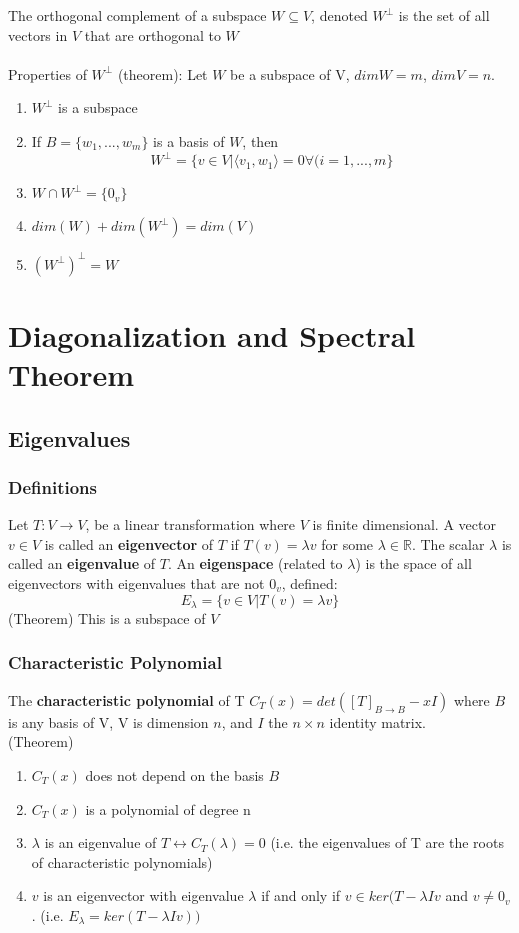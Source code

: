 \documentclass{article}
\begin{document}
The orthogonal complement of a subspace $W\subseteq V$, denoted $W^\bot$ is the set of all vectors in $V$ that are orthogonal to $W$
\\\\
Properties of $W^\bot$ (theorem): Let $W$ be a subspace of V, $dimW=m$, $dimV=n$.
\begin{enumerate}
    \item $W^\bot$ is a subspace
    \item If $B=\{w_1,...,w_m\}$ is a basis of $W$, then \[W^\bot=\{v\in V|\langle v_1,w_1\rangle=0 \forall(i=1,...,m\}\]
    \item $W\cap W^\bot = \{0_v\}$
    \item $dim(W)+dim(W^\bot) = dim(V)$
    \item $(W^\bot)^\bot=W$
\end{enumerate}
\section{Diagonalization and Spectral Theorem} %
\subsection{Eigenvalues}
\subsubsection{Definitions}
Let $T:V\rightarrow V$, be a linear transformation where $V$ is finite dimensional. A vector $v\in V$ is called an \textbf{eigenvector} of $T$ if $T(v)=\lambda v$ for some $\lambda\in\mathds{R}$. The scalar $\lambda$ is called an \textbf{eigenvalue }of $T$. An \textbf{eigenspace} (related to $\lambda$) is the space of all eigenvectors with eigenvalues that are not $0_v$, defined:
\[E_\lambda=\{v\in V|T(v)=\lambda v\}\]
(Theorem) This is a subspace of $V$
\subsubsection{Characteristic Polynomial}
The \textbf{characteristic polynomial} of T $C_T(x)=det([T]_{B\rightarrow B}-xI)$ where $B$ is any basis of V, V is dimension $n$, and $I$ the $n\times n$ identity matrix.
\\
(Theorem) 
\begin{enumerate}
    \item $C_T(x)$ does not depend on the basis $B$
    \item $C_T(x)$ is a polynomial of degree n
    \item $\lambda$ is an eigenvalue of $T\leftrightarrow C_T(\lambda)=0$ (i.e. the eigenvalues of T are the roots of characteristic polynomials)
    \item $v$ is an eigenvector with eigenvalue $\lambda$ if and only if $v\in ker(T-\lambda Iv$ and $v\ne 0_v$. (i.e. $E_\lambda = ker(T-\lambda I v))$
\end{enumerate}
\end{document}

